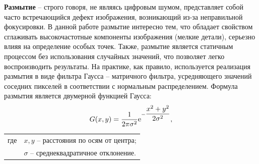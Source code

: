 {%
	
	\newpage
	 {\bf Размытие} -- строго говоря, не являясь цифровым шумом, представляет собой часто встречающийся дефект изображения, возникающий из-за неправильной фокусировки. В данной работе размытие интересно тем, что обладает свойством сглаживать высокочастотные компоненты изображения (мелкие детали), серьезно влияя на определение особых точек. Также, размытие является статичным процессом без использования случайных значений, что позволяет легко воспроизводить результаты. На практике, как правило, используется реализация размытия в виде фильтра Гаусса -- матричного фильтра, усредняющего значений соседних пикселей в соответствии с нормальным распределением. Формула размытия является двумерной функцией Гаусса:
	$$G(x, y)=\dfrac{1}{2\pi\sigma^2}{\rm e}^{-\dfrac{x^2+y^2}{2\sigma^2}},$$
	\begin{tabular}{ rl }
		где 
		& $x, y$ -- расстояния по осям от центра;\\
		& $\sigma$ -- среднеквадратичное отклонение. \\
	\end{tabular}\\

}
